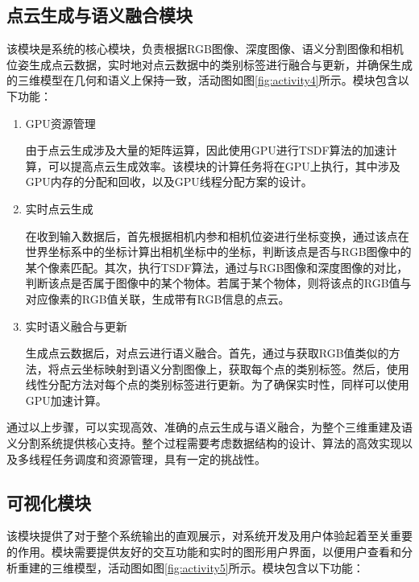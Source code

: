\subsection{点云生成与语义融合模块}
\par 该模块是系统的核心模块，负责根据RGB图像、深度图像、语义分割图像和相机位姿生成点云数据，实时地对点云数据中的类别标签进行融合与更新，并确保生成的三维模型在几何和语义上保持一致，活动图如图\ref{fig:activity4}所示。模块包含以下功能：
\begin{enumerate}
	\item{GPU资源管理}
	\par 由于点云生成涉及大量的矩阵运算，因此使用GPU进行TSDF算法的加速计算，可以提高点云生成效率。该模块的计算任务将在GPU上执行，其中涉及GPU内存的分配和回收，以及GPU线程分配方案的设计。

	\item{实时点云生成}
	\par 在收到输入数据后，首先根据相机内参和相机位姿进行坐标变换，通过该点在世界坐标系中的坐标计算出相机坐标中的坐标，判断该点是否与RGB图像中的某个像素匹配。其次，执行TSDF算法，通过与RGB图像和深度图像的对比，判断该点是否属于图像中的某个物体。若属于某个物体，则将该点的RGB值与对应像素的RGB值关联，生成带有RGB信息的点云。

	\item{实时语义融合与更新}
	\par 生成点云数据后，对点云进行语义融合。首先，通过与获取RGB值类似的方法，将点云坐标映射到语义分割图像上，获取每个点的类别标签。然后，使用线性分配方法对每个点的类别标签进行更新。为了确保实时性，同样可以使用GPU加速计算。
\end{enumerate}

\par 通过以上步骤，可以实现高效、准确的点云生成与语义融合，为整个三维重建及语义分割系统提供核心支持。整个过程需要考虑数据结构的设计、算法的高效实现以及多线程任务调度和资源管理，具有一定的挑战性。

\subsection{可视化模块}
\par 该模块提供了对于整个系统输出的直观展示，对系统开发及用户体验起着至关重要的作用。模块需要提供友好的交互功能和实时的图形用户界面，以便用户查看和分析重建的三维模型，活动图如图\ref{fig:activity5}所示。模块包含以下功能：

